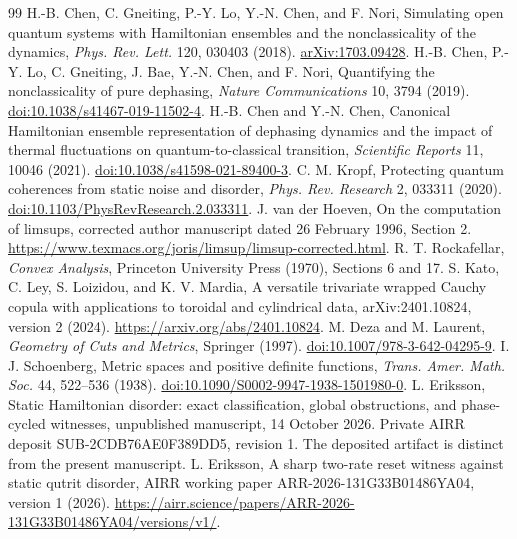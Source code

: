 \documentclass[11pt,a4paper]{article}
\theoremstyle{remark}\newtheorem{remark}[theorem]{Remark}
\begin{document}
\begin{thebibliography}{99}
 H.-B. Chen, C. Gneiting, P.-Y. Lo, Y.-N. Chen,
and F. Nori, Simulating open quantum systems with Hamiltonian ensembles
and the nonclassicality of the dynamics, \emph{Phys. Rev. Lett.} 120,
030403 (2018). \href{https://arxiv.org/abs/1703.09428}{arXiv:1703.09428}.
 H.-B. Chen, P.-Y. Lo, C. Gneiting, J. Bae,
Y.-N. Chen, and F. Nori, Quantifying the nonclassicality of pure dephasing,
\emph{Nature Communications} 10, 3794 (2019).
\href{https://doi.org/10.1038/s41467-019-11502-4}{doi:10.1038/s41467-019-11502-4}.
 H.-B. Chen and Y.-N. Chen, Canonical Hamiltonian ensemble
representation of dephasing dynamics and the impact of thermal
fluctuations on quantum-to-classical transition, \emph{Scientific Reports}
11, 10046 (2021).
\href{https://doi.org/10.1038/s41598-021-89400-3}{doi:10.1038/s41598-021-89400-3}.
 C. M. Kropf, Protecting quantum coherences from static
noise and disorder, \emph{Phys. Rev. Research} 2, 033311 (2020).
\href{https://doi.org/10.1103/PhysRevResearch.2.033311}{doi:10.1103/PhysRevResearch.2.033311}.
 J. van der Hoeven, On the computation of limsups,
corrected author manuscript dated 26 February 1996, Section 2.
\url{https://www.texmacs.org/joris/limsup/limsup-corrected.html}.
 R. T. Rockafellar, \emph{Convex Analysis},
Princeton University Press (1970), Sections 6 and 17.
 S. Kato, C. Ley, S. Loizidou, and K. V. Mardia,
A versatile trivariate wrapped Cauchy copula with applications to
toroidal and cylindrical data, arXiv:2401.10824, version 2 (2024).
\url{https://arxiv.org/abs/2401.10824}.
 M. Deza and M. Laurent, \emph{Geometry of Cuts and
Metrics}, Springer (1997).
\href{https://doi.org/10.1007/978-3-642-04295-9}{doi:10.1007/978-3-642-04295-9}.
 I. J. Schoenberg, Metric spaces and positive
definite functions, \emph{Trans. Amer. Math. Soc.} 44, 522--536 (1938).
\href{https://doi.org/10.1090/S0002-9947-1938-1501980-0}{doi:10.1090/S0002-9947-1938-1501980-0}.
 L. Eriksson, Static Hamiltonian disorder: exact
classification, global obstructions, and phase-cycled witnesses,
unpublished manuscript, 14 October 2026. Private AIRR deposit
SUB-2CDB76AE0F389DD5, revision 1. The deposited artifact is distinct
from the present manuscript.
 L. Eriksson, A sharp two-rate reset witness against static qutrit
disorder, AIRR working paper ARR-2026-131G33B01486YA04, version 1 (2026).
\url{https://airr.science/papers/ARR-2026-131G33B01486YA04/versions/v1/}.
\end{thebibliography}
\end{document}
